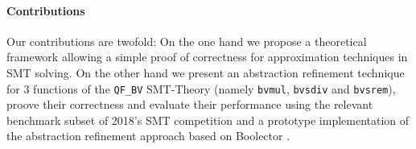 \paragraph{Contributions}
Our contributions are twofold:
On the one hand we propose a theoretical framework allowing a simple proof of correctness for approximation techniques in SMT solving.
On the other hand we present an abstraction refinement technique for 3 functions of the \texttt{QF\_BV} SMT-Theory (namely \texttt{bvmul}, \texttt{bvsdiv} and \texttt{bvsrem}), proove their correctness and evaluate their performance using the relevant benchmark subset of 2018's SMT competition \cite{SMTCOMP18} and a prototype implementation of the abstraction refinement approach based on Boolector \cite{NiemetzPreinerBiere-JSAT15}.